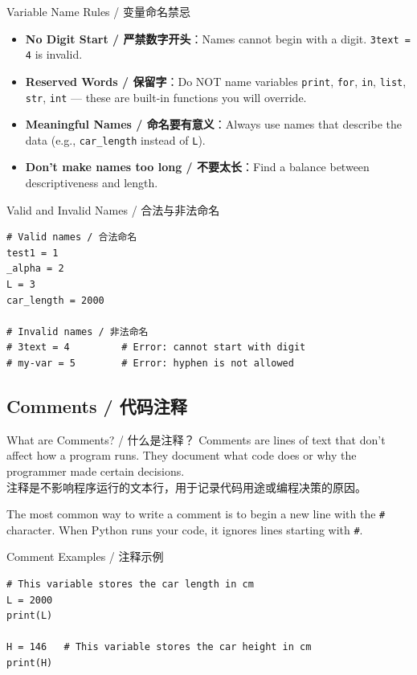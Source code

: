 \documentclass[11pt,a4paper]{report}
\let\oldtexttt\texttt
\renewcommand{\texttt}[1]{\textcolor{mainblue}{\oldtexttt{#1}}}
\begin{document}
\begin{warning}{Variable Name Rules / 变量命名禁忌}
    \begin{itemize}
        \item \textbf{No Digit Start / 严禁数字开头}：Names cannot begin with a digit. \texttt{3text = 4} is invalid.
        \item \textbf{Reserved Words / 保留字}：Do NOT name variables \texttt{print}, \texttt{for}, \texttt{in}, \texttt{list}, \texttt{str}, \texttt{int} — these are built-in functions you will override.
        \item \textbf{Meaningful Names / 命名要有意义}：Always use names that describe the data (e.g., \texttt{car\_length} instead of \texttt{L}).
        \item \textbf{Don't make names too long / 不要太长}：Find a balance between descriptiveness and length.
    \end{itemize}
\end{warning}

\begin{examplebox}{Valid and Invalid Names / 合法与非法命名}
\begin{lstlisting}
# Valid names / 合法命名
test1 = 1
_alpha = 2
L = 3
car_length = 2000

# Invalid names / 非法命名
# 3text = 4         # Error: cannot start with digit
# my-var = 5        # Error: hyphen is not allowed
\end{lstlisting}
\end{examplebox}

\subsection{Comments / 代码注释}

\begin{concept}{What are Comments? / 什么是注释？}
    Comments are lines of text that don't affect how a program runs. They document what code does or why the programmer made certain decisions. \\
    注释是不影响程序运行的文本行，用于记录代码用途或编程决策的原因。

    The most common way to write a comment is to begin a new line with the \texttt{\#} character. When Python runs your code, it ignores lines starting with \texttt{\#}.
\end{concept}

\begin{examplebox}{Comment Examples / 注释示例}
\begin{lstlisting}
# This variable stores the car length in cm
L = 2000
print(L)

H = 146   # This variable stores the car height in cm
print(H)
\end{lstlisting}
\end{examplebox}
\end{document}
